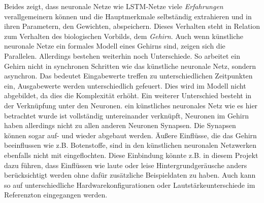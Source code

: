 Beides zeigt, dass neuronale Netze wie \ac{LSTM}-Netze viele
\textit{Erfahrungen} verallgemeinern können und die Hauptmerkmale selbständig
extrahieren und in ihren Parametern, den Gewichten, abspeichern. Dieses
Verhalten steht in Relation zum Verhalten des biologischen Vorbilds, dem
\textit{Gehirn}. Auch wenn künstliche neuronale Netze ein formales Modell eines
Gehirns sind, zeigen sich die Parallelen. Allerdings bestehen weiterhin noch
Unterschiede. So arbeitet ein Gehirn nicht in synchronen Schritten wie das
künstliche neuronale Netz, sondern asynchron. Das bedeutet Eingabewerte treffen
zu unterschiedlichen Zeitpunkten ein, Ausgabewerte werden unterschiedlich
gefeuert. Dies wird im Modell nicht abgebildet, da dies die Komplexität erhöht.
Ein weiterer Unterschied besteht in der Verknüpfung unter den Neuronen. ein
künstliches neuronales Netz wie es hier betrachtet wurde ist vollständig
untereinander verknüpft, Neuronen im Gehirn haben allerdings nicht zu allen
anderen Neuronen Synapsen. Die Synapsen können sogar auf- und wieder abgebaut
werden. Äußere Einflüsse, die das Gehirn beeinflussen wie z.B. Botenstoffe, sind
in den künstlichen neuronalen Netzwerken ebenfalls nicht mit eingeflochten.
Diese Einbindung könnte z.B. in diesem Projekt dazu führen, dass Einflüssen wie
laute oder leise Hintergrundgeräusche anders berücksichtigt werden ohne dafür
zusätzliche Beispieldaten zu haben. Auch kann so auf unterschiedliche
Hardwarekonfigurationen oder Lautstärkeunterschiede im Referenzton eingegangen
werden.
 
